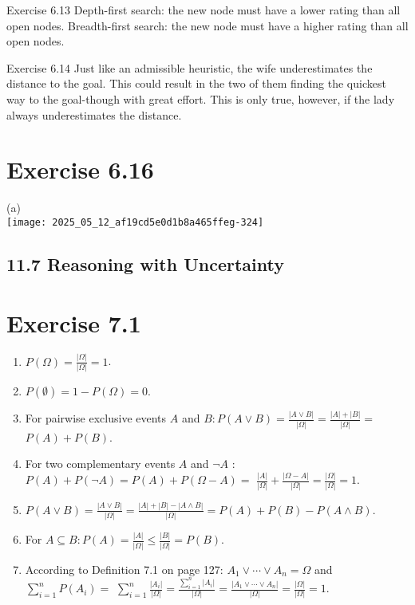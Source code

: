 \documentclass[10pt]{article}
\begin{document}
Exercise 6.13 Depth-first search: the new node must have a lower rating than all open nodes. Breadth-first search: the new node must have a higher rating than all open nodes.

Exercise 6.14 Just like an admissible heuristic, the wife underestimates the distance to the goal. This could result in the two of them finding the quickest way to the goal-though with great effort. This is only true, however, if the lady always underestimates the distance.

\section*{Exercise 6.16}
(a)\\
\texttt{[image: 2025\_05\_12\_af19cd5e0d1b8a465ffeg-324]}

\subsection*{11.7 Reasoning with Uncertainty}
\section*{Exercise 7.1}
\begin{enumerate}
  \item $P(\Omega)=\frac{|\Omega|}{|\Omega|}=1$.
  \item $P(\emptyset)=1-P(\Omega)=0$.
  \item For pairwise exclusive events $A$ and $B: P(A \vee B)=\frac{|A \vee B|}{|\Omega|}=\frac{|A|+|B|}{|\Omega|}=$ $P(A)+P(B)$.
  \item For two complementary events $A$ and $\neg A$ : $P(A)+P(\neg A)=P(A)+P(\Omega-A)=$ $\frac{|A|}{|\Omega|}+\frac{|\Omega-A|}{|\Omega|}=\frac{|\Omega|}{|\Omega|}=1$.
  \item $P(A \vee B)=\frac{|A \vee B|}{|\Omega|}=\frac{|A|+|B|-|A \wedge B|}{|\Omega|}=P(A)+P(B)-P(A \wedge B)$.
  \item For $A \subseteq B: P(A)=\frac{|A|}{|\Omega|} \leq \frac{|B|}{|\Omega|}=P(B)$.
  \item According to Definition 7.1 on page 127: $A_{1} \vee \cdots \vee A_{n}=\Omega$ and $\sum_{i=1}^{n} P\left(A_{i}\right)=$ $\sum_{i=1}^{n} \frac{\left|A_{i}\right|}{|\Omega|}=\frac{\sum_{i=1}^{n}\left|A_{i}\right|}{|\Omega|}=\frac{\left|A_{1} \vee \cdots \vee A_{n}\right|}{|\Omega|}=\frac{|\Omega|}{|\Omega|}=1$.
\end{enumerate}
\end{document}
